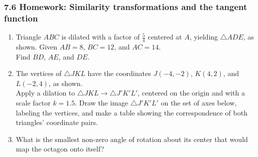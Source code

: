 \documentclass[12pt, twoside]{article}
\begin{document}
\subsubsection*{7.6 Homework: Similarity transformations and the tangent function}
  \begin{enumerate}

  \item Triangle $ABC$ is dilated with a factor of $\frac{5}{4}$ centered at $A$, yielding $\triangle ADE$, as shown. Given $AB=8$, $BC=12$, and $AC=14$. \\[0.25cm] Find $BD$, $AE$, and $DE$. \vspace{1cm}
  \begin{flushright}
    \end{flushright}

  \item The vertices of $\triangle JKL$ have the coordinates $J(-4,-2)$, $K(4,2)$, and $L(-2,4)$, as shown. \\[0.25cm]
  Apply a dilation to $\triangle JKL \rightarrow \triangle J'K'L'$, centered on the origin and with a scale factor $k=1.5$. Draw the image $\triangle J'K'L'$ on the set of axes below, labeling the vertices, and make a table showing the correspondence of both triangles' coordinate pairs.
    \begin{flushright}
    \end{flushright}

\newpage
  \item What is the smallest non-zero angle of rotation about its center that would map the octagon onto itself? \vspace{0.25cm}
  \begin{center}
    \end{center}


\end{enumerate}
\end{document}
